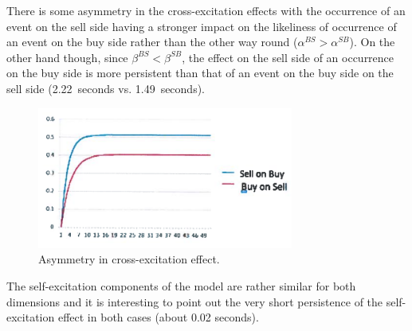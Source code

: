	
There is some asymmetry in the cross-excitation effects with the occurrence of an event on the sell side having a stronger impact on the likeliness of occurrence of an event on the buy side rather than the other way round ($\alpha^{BS} > \alpha^{SB}$). On the other hand though, since $\beta^{BS} < \beta^{SB}$, the effect on the sell side of an occurrence on the buy side is more persistent than that of an event on the buy side on the sell side (2.22~seconds vs. 1.49~seconds).
	\begin{figure}[!ht]
   	\centering
   	\includegraphics[width=0.75\textwidth]{chapters/chapter_trade_data_models/figures/asymcross.png} 
   	\caption{Asymmetry in cross-excitation effect.\label{fig:asymcross}}
	\end{figure}
The self-excitation components of the model are rather similar for both dimensions and it is interesting to point out the very short persistence of the self-excitation effect in both cases (about 0.02 seconds).


